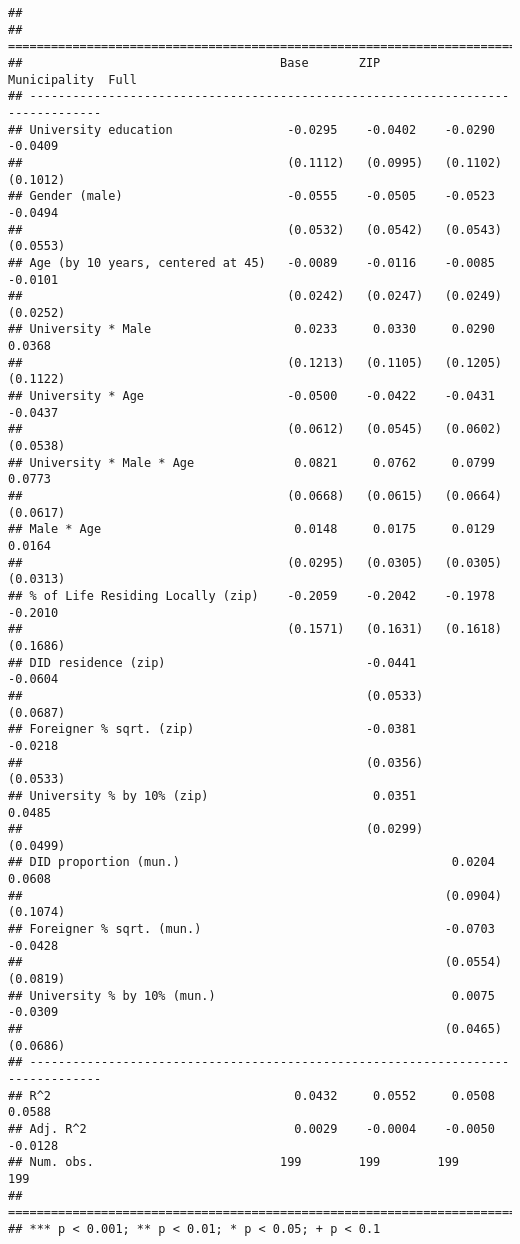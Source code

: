 \documentclass[
]{article}
\begin{document}
\begin{verbatim}
## 
## ================================================================================
##                                    Base       ZIP        Municipality  Full     
## --------------------------------------------------------------------------------
## University education                -0.0295    -0.0402    -0.0290       -0.0409 
##                                     (0.1112)   (0.0995)   (0.1102)      (0.1012)
## Gender (male)                       -0.0555    -0.0505    -0.0523       -0.0494 
##                                     (0.0532)   (0.0542)   (0.0543)      (0.0553)
## Age (by 10 years, centered at 45)   -0.0089    -0.0116    -0.0085       -0.0101 
##                                     (0.0242)   (0.0247)   (0.0249)      (0.0252)
## University * Male                    0.0233     0.0330     0.0290        0.0368 
##                                     (0.1213)   (0.1105)   (0.1205)      (0.1122)
## University * Age                    -0.0500    -0.0422    -0.0431       -0.0437 
##                                     (0.0612)   (0.0545)   (0.0602)      (0.0538)
## University * Male * Age              0.0821     0.0762     0.0799        0.0773 
##                                     (0.0668)   (0.0615)   (0.0664)      (0.0617)
## Male * Age                           0.0148     0.0175     0.0129        0.0164 
##                                     (0.0295)   (0.0305)   (0.0305)      (0.0313)
## % of Life Residing Locally (zip)    -0.2059    -0.2042    -0.1978       -0.2010 
##                                     (0.1571)   (0.1631)   (0.1618)      (0.1686)
## DID residence (zip)                            -0.0441                  -0.0604 
##                                                (0.0533)                 (0.0687)
## Foreigner % sqrt. (zip)                        -0.0381                  -0.0218 
##                                                (0.0356)                 (0.0533)
## University % by 10% (zip)                       0.0351                   0.0485 
##                                                (0.0299)                 (0.0499)
## DID proportion (mun.)                                      0.0204        0.0608 
##                                                           (0.0904)      (0.1074)
## Foreigner % sqrt. (mun.)                                  -0.0703       -0.0428 
##                                                           (0.0554)      (0.0819)
## University % by 10% (mun.)                                 0.0075       -0.0309 
##                                                           (0.0465)      (0.0686)
## --------------------------------------------------------------------------------
## R^2                                  0.0432     0.0552     0.0508        0.0588 
## Adj. R^2                             0.0029    -0.0004    -0.0050       -0.0128 
## Num. obs.                          199        199        199           199      
## ================================================================================
## *** p < 0.001; ** p < 0.01; * p < 0.05; + p < 0.1
\end{verbatim}
\end{document}
